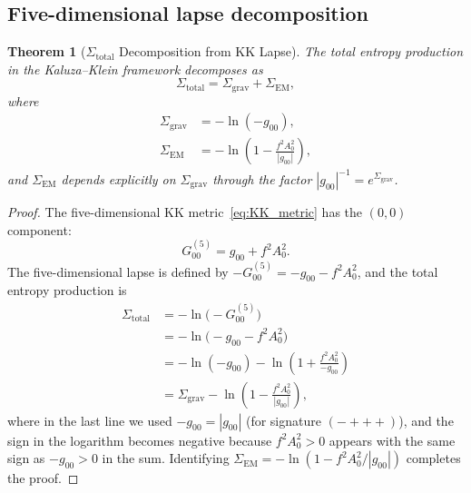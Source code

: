 \documentclass[letterpaper,twocolumn,superscriptaddress,longbibliography]{revtex4-2}
\newtheorem{theorem}{Theorem}[section]
\newcommand{\abs}[1]{\left|#1\right|}
\newcommand{\Sgrav}{\Sigma_{\mathrm{grav}}}
\newcommand{\SEM}{\Sigma_{\mathrm{EM}}}
\newcommand{\Stot}{\Sigma_{\mathrm{total}}}
\begin{document}
\subsection{Five-dimensional lapse decomposition}
\label{sec:5D_lapse}

\begin{theorem}[$\Stot$ Decomposition from KK Lapse]
\label{thm:decomposition}
The total entropy production in the Kaluza--Klein framework
decomposes as
\begin{equation}
  \Stot = \Sgrav + \SEM,
  \label{eq:Sigma_decomp_def}
\end{equation}
where
\begin{align}
  \Sgrav &= -\ln(-g_{00}),
  \label{eq:Sgrav_def} \\[4pt]
  \SEM &= -\ln\!\left(1 - \frac{f^2 A_0^2}{\abs{g_{00}}}
  \right),
  \label{eq:SEM_def}
\end{align}
and $\SEM$ depends explicitly on $\Sgrav$ through
the factor $\abs{g_{00}}^{-1} = e^{\Sgrav}$.
\end{theorem}

\begin{proof}
The five-dimensional KK metric~\eqref{eq:KK_metric}
has the $(0,0)$ component:
\begin{equation}
  G_{00}^{(5)} = g_{00} + f^2 A_0^2.
  \label{eq:G00_5}
\end{equation}
The five-dimensional lapse is defined by
$-G_{00}^{(5)} = -g_{00} - f^2 A_0^2$, and the total
entropy production is
\begin{align}
  \Stot &= -\ln\bigl(-G_{00}^{(5)}\bigr)
  \nonumber \\
  &= -\ln\bigl(-g_{00} - f^2 A_0^2\bigr)
  \nonumber \\
  &= -\ln(-g_{00})
     -\ln\!\left(1 + \frac{f^2 A_0^2}{-g_{00}}\right)
  \nonumber \\
  &= \Sgrav
     -\ln\!\left(1 - \frac{f^2 A_0^2}{\abs{g_{00}}}\right),
  \label{eq:Stot_derivation}
\end{align}
where in the last line we used $-g_{00} = \abs{g_{00}}$
(for signature $({-}{+}{+}{+})$), and the sign in the
logarithm becomes negative because $f^2 A_0^2 > 0$ appears
with the same sign as $-g_{00} > 0$ in the sum.
Identifying $\SEM = -\ln(1 - f^2 A_0^2/\abs{g_{00}})$
completes the proof.
\end{proof}
\end{document}
